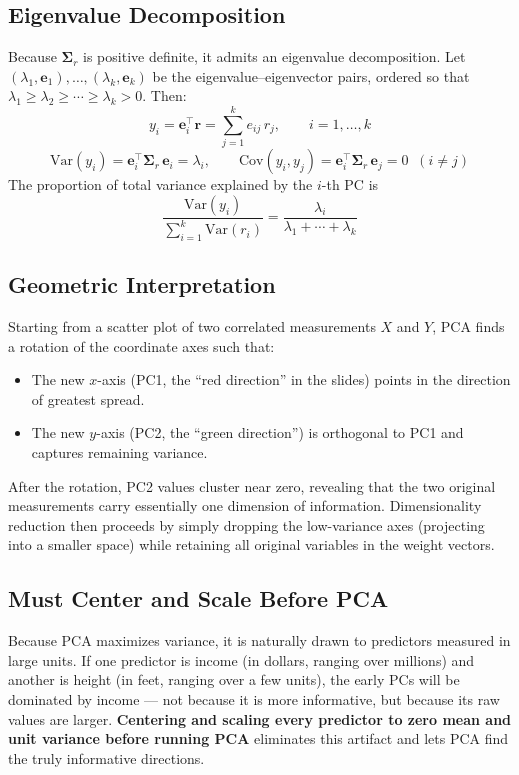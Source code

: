 \documentclass[11pt]{article}
\begin{document}
\subsection{Eigenvalue Decomposition}
Because $\boldsymbol{\Sigma}_r$ is positive definite, it admits an eigenvalue decomposition. Let $(\lambda_1, \mathbf{e}_1), \ldots, (\lambda_k, \mathbf{e}_k)$ be the eigenvalue--eigenvector pairs, ordered so that $\lambda_1 \geq \lambda_2 \geq \cdots \geq \lambda_k > 0$. Then:
\[
  y_i = \mathbf{e}_i^{\top}\mathbf{r} = \sum_{j=1}^{k} e_{ij}\, r_j, \qquad i = 1, \ldots, k
\]
\[
  \mathrm{Var}(y_i) = \mathbf{e}_i^{\top}\boldsymbol{\Sigma}_r\,\mathbf{e}_i = \lambda_i, \qquad
  \mathrm{Cov}(y_i, y_j) = \mathbf{e}_i^{\top}\boldsymbol{\Sigma}_r\,\mathbf{e}_j = 0 \;\; (i \neq j)
\]
The proportion of total variance explained by the $i$-th PC is
\[
  \frac{\mathrm{Var}(y_i)}{\displaystyle\sum_{i=1}^{k}\mathrm{Var}(r_i)}
  = \frac{\lambda_i}{\lambda_1 + \cdots + \lambda_k}
\]

\subsection{Geometric Interpretation}
Starting from a scatter plot of two correlated measurements $X$ and $Y$, PCA finds a rotation of the coordinate axes such that:
\begin{itemize}
    \item The new $x$-axis (PC1, the ``red direction'' in the slides) points in the direction of greatest spread.
    \item The new $y$-axis (PC2, the ``green direction'') is orthogonal to PC1 and captures remaining variance.
\end{itemize}
After the rotation, PC2 values cluster near zero, revealing that the two original measurements carry essentially one dimension of information. Dimensionality reduction then proceeds by simply dropping the low-variance axes (projecting into a smaller space) while retaining all original variables in the weight vectors.

\subsection{Must Center and Scale Before PCA}
Because PCA maximizes variance, it is naturally drawn to predictors measured in large units. If one predictor is income (in dollars, ranging over millions) and another is height (in feet, ranging over a few units), the early PCs will be dominated by income --- not because it is more informative, but because its raw values are larger. \textbf{Centering and scaling every predictor to zero mean and unit variance before running PCA} eliminates this artifact and lets PCA find the truly informative directions.
\end{document}

